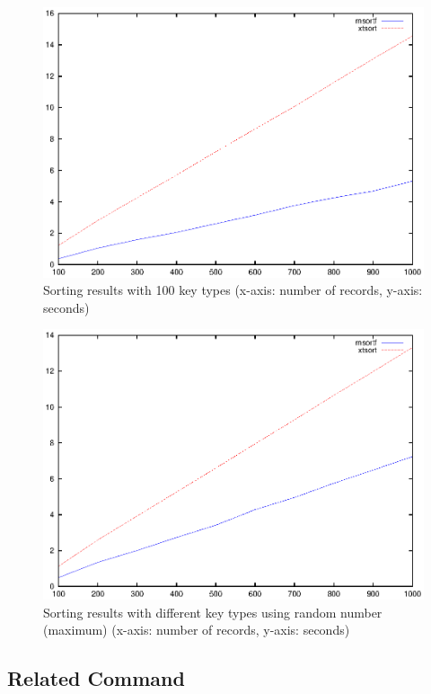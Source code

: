 
\begin{figure}[hbt]
\begin{center}
\includegraphics[scale=.8]{figure/msortf/line_100.eps}
\end{center}
\vspace{10 mm}
\caption{Sorting results with 100 key types (x-axis: number of records, y-axis: seconds)\label{fig:msortf:bench3}}
\end{figure}

\begin{figure}[hbt]
\begin{center}
\includegraphics[scale=.8]{figure/msortf/line_rand.eps}
\end{center}
\vspace{10 mm}
\caption{Sorting results with different key types using random number (maximum) (x-axis: number of records, y-axis: seconds)\label{fig:msortf:bench4}}
\end{figure}

\subsection*{Related Command}


%
